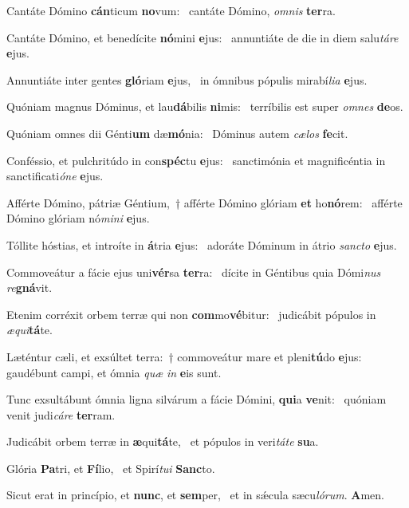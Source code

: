 \item Cantáte Dómino \textbf{cán}ticum \textbf{no}vum:~\psstar{} cantáte Dómino, \textit{omnis} \textbf{ter}ra.
\item Cantáte Dómino, et benedícite \textbf{nó}mini \textbf{e}jus:~\psstar{} annuntiáte de die in diem salu\textit{táre} \textbf{e}jus.
\item Annuntiáte inter gentes \textbf{gló}riam \textbf{e}jus,~\psstar{} in ómnibus pópulis mirabí\textit{lia} \textbf{e}jus.
\item Quóniam magnus Dóminus, et lau\textbf{dá}bilis \textbf{ni}mis:~\psstar{} terríbilis est super \textit{omnes} \textbf{de}os.
\item Quóniam omnes dii Génti\textbf{um} dæ\textbf{mó}nia:~\psstar{} Dóminus autem \textit{cælos} \textbf{fe}cit.
\item Conféssio, et pulchritúdo in con\textbf{spéc}tu \textbf{e}jus:~\psstar{} sanctimónia et magnificéntia in sanctificati\textit{óne} \textbf{e}jus.
\item Afférte Dómino, pátriæ Géntium,~† afférte Dómino glóriam \textbf{et} ho\textbf{nó}rem:~\psstar{} afférte Dómino glóriam nó\textit{mini} \textbf{e}jus.
\item Tóllite hóstias, et introíte in \textbf{á}tria \textbf{e}jus:~\psstar{} adoráte Dóminum in átrio \textit{sancto} \textbf{e}jus.
\item Commoveátur a fácie ejus uni\textbf{vér}sa \textbf{ter}ra:~\psstar{} dícite in Géntibus quia Dómi\textit{nus} \textit{re}\textbf{gná}vit.
\item Etenim corréxit orbem terræ qui non \textbf{com}mo\textbf{vé}bitur:~\psstar{} judicábit pópulos in \textit{æqui}\textbf{tá}te.
\item Læténtur cæli, et exsúltet terra:~† commoveátur mare et pleni\textbf{tú}do \textbf{e}jus:~\psstar{} gaudébunt campi, et ómnia \textit{quæ} \textit{in} \textbf{e}is sunt.
\item Tunc exsultábunt ómnia ligna silvárum a fácie Dómini, \textbf{qui}a \textbf{ve}nit:~\psstar{} quóniam venit judi\textit{cáre} \textbf{ter}ram.
\item Judicábit orbem terræ in \textbf{æ}qui\textbf{tá}te,~\psstar{} et pópulos in veri\textit{táte} \textbf{su}a.
\item Glória \textbf{Pa}tri, et \textbf{Fí}lio,~\psstar{} et Spirí\textit{tui} \textbf{Sanc}to.
\item Sicut erat in princípio, et \textbf{nunc}, et \textbf{sem}per,~\psstar{} et in sǽcula sæcu\textit{lórum}. \textbf{A}men.